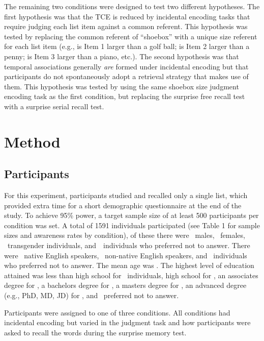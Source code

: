 \documentclass[man,natbib,floatsintext]{apa6} %
\begin{document}
The remaining two conditions were designed to test two different hypotheses.
The first hypothesis was that the TCE is reduced by incidental encoding tasks that require judging each list item against a common referent. This hypothesis was tested by replacing the common referent of ``shoebox'' with a unique size referent for each list item (e.g., is Item 1 larger than a golf ball; is Item 2 larger than a penny; is Item 3 larger than a piano, etc.). The second hypothesis was that temporal associations generally \emph{are} formed under incidental encoding but that participants do not spontaneously adopt a retrieval strategy that makes use of them. This hypothesis was tested by using the same shoebox size judgment encoding task as the first condition, but replacing the surprise free recall test with a surprise serial recall test.

\section{Method}
\label{TODO-8}
\subsection{Participants}
For this experiment, participants studied and recalled only a single list, which provided extra time for a short demographic questionnaire at the end of the study. To achieve 95\% power, a target sample size of at least 500 participants per condition was set. A total of 1591 individuals participated (see Table 1 for sample sizes and awareness rates by condition), of these there were \males~males, \females~females, \others~transgender individuals, and~\notans~individuals who preferred not to answer. There were \engY~native English speakers, \engN~non-native English speakers, and \engS~individuals who preferred not to answer.  The mean age was \age. The highest level of education attained was less than high school for \noed~individuals, high school for \hschool, an associates degree for \ass, a bachelors degree for \bac, a masters degree for \mas, an advanced degree (e.g., PhD, MD, JD) for \phd, and \notansed~preferred not to answer.

Participants were assigned to one of three conditions. All conditions had incidental encoding but varied in the judgment task and how participants were asked to recall the words during the surprise memory test.
\end{document}

